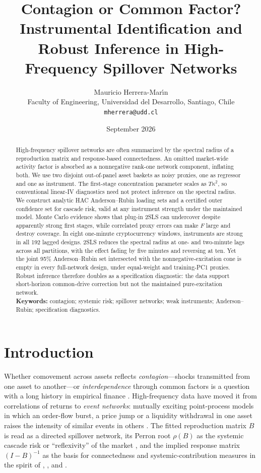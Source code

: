 \documentclass[12pt]{article}
\title{\textbf{Contagion or Common Factor? Instrumental Identification and Robust Inference in High-Frequency Spillover Networks}}
\author{Mauricio Herrera-Mar\'{\i}n\\ \small Faculty of Engineering, Universidad del Desarrollo, Santiago, Chile\\ \small \texttt{mherrera@udd.cl}}
\date{September 2026}
\theoremstyle{plain}\newtheorem{theorem}{Theorem}[section]\newtheorem{proposition}[theorem]{Proposition}\newtheorem{lemma}[theorem]{Lemma}\newtheorem{corollary}[theorem]{Corollary}
\theoremstyle{definition}\newtheorem{definition}[theorem]{Definition}\newtheorem{assumption}[theorem]{Assumption}\newtheorem{remark}[theorem]{Remark}
\begin{document}
\maketitle
\begin{abstract}
\noindent High-frequency spillover networks are often summarized by the spectral radius of a reproduction matrix and response-based connectedness. An omitted market-wide activity factor is absorbed as a nonnegative rank-one network component, inflating both. We use two disjoint out-of-panel asset baskets as noisy proxies, one as regressor and one as instrument. The first-stage concentration parameter scales as $T\kappa^2$, so conventional linear-IV diagnostics need not protect inference on the spectral radius. We construct analytic HAC Anderson--Rubin loading sets and a certified outer confidence set for cascade risk, valid at any instrument strength under the maintained model. Monte Carlo evidence shows that plug-in 2SLS can undercover despite apparently strong first stages, while correlated proxy errors can make $F$ large and destroy coverage. In eight one-minute cryptocurrency windows, instruments are strong in all 192 lagged designs. 2SLS reduces the spectral radius at one- and two-minute lags across all partitions, with the effect fading by five minutes and reversing at ten. Yet the joint 95\% Anderson--Rubin set intersected with the nonnegative-excitation cone is empty in every full-network design, under equal-weight and training-PC1 proxies. Robust inference therefore doubles as a specification diagnostic: the data support short-horizon common-drive correction but not the maintained pure-excitation network.
\\[3pt]
\noindent\textbf{Keywords:} contagion; systemic risk; spillover networks; weak instruments; Anderson--Rubin; specification diagnostics.
\end{abstract}

\section{Introduction}
Whether comovement across assets reflects \emph{contagion}---shocks transmitted from one asset to another---or \emph{interdependence} through common factors is a question with a long history in empirical finance \citep{forbes2002,bekaert2005}. High-frequency data have moved it from correlations of returns to \emph{event networks}: mutually exciting point-process models in which an order-flow burst, a price jump or a liquidity withdrawal in one asset raises the intensity of similar events in others \citep{aitsahalia2015,bacry2015}. The fitted reproduction matrix $B$ is read as a directed spillover network, its Perron root $\rho(B)$ as the systemic cascade risk or ``reflexivity'' of the market \citep{hardiman2013,filimonov2015}, and the implied response matrix $(I-B)^{-1}$ as the basis for connectedness and systemic-contribution measures in the spirit of \citet{diebold2014}, \citet{billio2012}, \citet{adrian2016} and \citet{acharya2017}.
\end{document}
